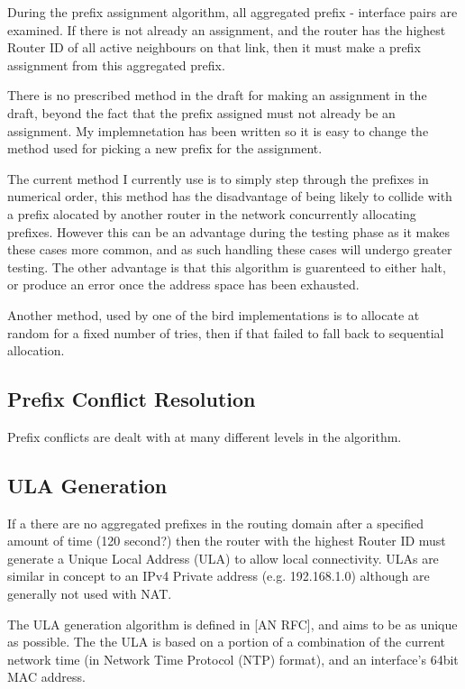 \documentclass[12pt]{report}
\begin{document}
During the prefix assignment algorithm, all aggregated prefix - interface pairs are 
examined. If there is not already an assignment, and the router has the highest 
Router ID of all active neighbours on that link, then it must make a prefix 
assignment from this aggregated prefix. 

There is no prescribed method in the draft for making an assignment in the draft, 
beyond the fact that the prefix assigned must not already be an assignment. My 
implemnetation has been written so it is easy to change the method used for picking 
a new prefix for the assignment. 

The current method I currently use is to simply step through the prefixes in 
numerical order, this method has the disadvantage of being likely to collide with a 
prefix alocated by another router in the network concurrently allocating prefixes. 
However this can be an advantage during the testing phase as it makes these cases 
more common, and as such handling these cases will undergo greater testing. The 
other advantage is that this algorithm is guarenteed to either halt, or produce an 
error once the address space has been exhausted. 

Another method, used by one of the bird implementations is to allocate at random for a fixed number of tries, then if that failed to fall back to sequential allocation. 


\subsection{Prefix Conflict Resolution}
Prefix conflicts are dealt with at many different levels in the algorithm. 

\subsection{ULA Generation}
If a there are no aggregated prefixes in the routing domain after a specified amount 
of time (120 second?) then the router with the highest Router ID must generate a 
Unique Local Address (ULA) to allow local connectivity. ULAs are similar in concept 
to an IPv4 Private address (e.g. 192.168.1.0) although are generally not used with 
NAT. 

The ULA generation algorithm is defined in [AN RFC], and aims to be as unique as 
possible. The the ULA is based on a portion of a combination of the current network 
time (in Network Time Protocol (NTP) format), and an interface's 64bit MAC address. 
\end{document}
